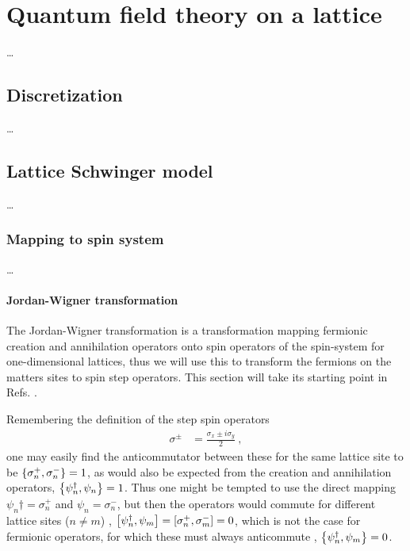 \documentclass[../main.tex]{subfiles} %
\begin{document}
\chapter{Quantum field theory on a lattice} \label{chap:LatticeQFT}

\ldots




\section{Discretization}

\ldots




\section{Lattice Schwinger model}

\ldots




\subsection{Mapping to spin system}

\ldots



\subsubsection{Jordan-Wigner transformation}

The Jordan-Wigner transformation is a transformation mapping fermionic creation and annihilation operators onto spin operators of the spin-\half system for one-dimensional lattices, thus we will use this to transform the fermions on the matters sites to spin step operators. This section will take its starting point in Refs. \cite{jordan-wigner_1928, banksSusskindKogut_StrongCopling_1976, panyella_masterThesis_2019}.

Remembering the definition of the step spin operators \cite{sakurai_modernQM_2017}
\begin{align}
    \sigma^\pm &= \frac{\sigma_x \pm i \sigma_y}{2} \: ,
\end{align}
one may easily find the anticommutator between these for the same lattice site to be $\anticommutator{\sigma_n^+}{\sigma_n^-} = 1$, as would also be expected from the creation and annihilation operators, $\anticommutator{\psi_n\dagger}{\psi_n} = 1$. Thus one might be tempted to use the direct mapping $\psi_n\dagger = \sigma_n^+$ and $\psi_n = \sigma_n^-$, but then the operators would commute for different lattice sites ($n \ne m$) \cite{susskind_latticeFermions_1977}, $\commutator{\psi_n\dagger}{\psi_m} = \commutator{\sigma_n^+}{\sigma_m^-} = 0$, which is not the case for fermionic operators, for which these must always anticommute \cite{sakurai_modernQM_2017}, $\anticommutator{\psi_n\dagger}{\psi_m} = 0$.
\end{document}
